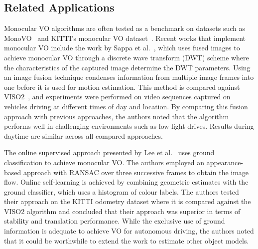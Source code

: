 \subsection{Related Applications}
Monocular VO algorithms are often tested as a benchmark on datasets such as MonoVO~\cite{engel_photometrically_2016} and KITTI's monocular VO dataset~\cite{geiger_are_2012}. Recent works that implement monocular VO include the work by Sappa et al.~\cite{sappa_monocular_2016}, which uses fused images to achieve monocular VO through a discrete wave transform (DWT) scheme where the characteristics of the captured image determine the DWT parameters. Using an image fusion technique condenses information from multiple image frames into one before it is used for motion estimation. This method is compared against VISO2~\cite{kitt_visual_2010}, and experiments were performed on video sequences captured on vehicles driving at different times of day and location. By comparing this fusion approach with previous approaches, the authors noted that the algorithm performs well in challenging environments such as low light drives. Results during daytime are similar across all compared approaches.  


The online supervised approach presented by Lee et al.~\cite{lee_online_2015} uses ground classification to achieve monocular VO. The authors employed an appearance-based approach with RANSAC over three successive frames to obtain the image flow. Online self-learning is achieved by combining geometric estimates with the ground classifier, which uses a histogram of colour labels. The authors tested their approach on the KITTI odometry dataset where it is compared against the VISO2 algorithm and concluded that their approach was superior in terms of stability and translation performance. While the exclusive use of ground information is adequate to achieve VO for autonomous driving, the authors noted that it could be worthwhile to extend the work to estimate other object models. 

